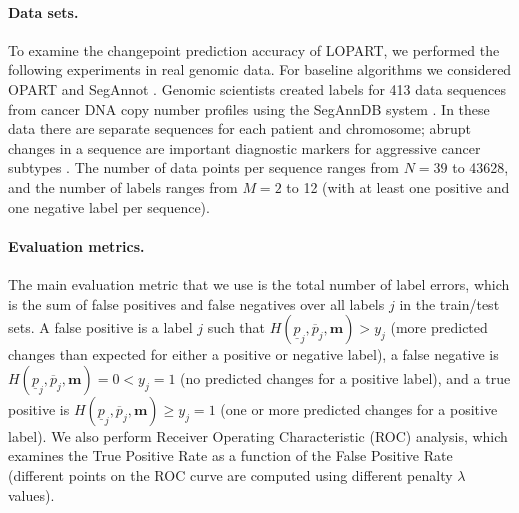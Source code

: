 \documentclass[12pt]{article}
\begin{document}
\paragraph{Data sets.} To examine the changepoint prediction accuracy of LOPART, we performed the following experiments in real genomic data. 
For baseline algorithms we considered OPART \citep{Jackson2005} and SegAnnot \citep{Hocking2014}.
Genomic scientists created labels for 413 data sequences from cancer DNA copy number profiles using the SegAnnDB system \citep{Hocking2014}.  
In these data there are separate sequences for each patient and chromosome; abrupt changes in a sequence are important diagnostic markers for aggressive cancer subtypes \citep{gudrun-jclinicaloncology}.
The number of data points per sequence ranges from $N=39$ to 43628, and the number of labels ranges from $M=2$ to 12 (with at least one positive and one negative label per sequence).

\paragraph{Evaluation metrics.} The main evaluation metric that we use is the total number of label errors, which is the sum of false positives and false negatives over all labels $j$ in the train/test sets.
A false positive is a label $j$ such that $H(\underline p_j, \overline p_j, \mathbf m) > y_j$ (more predicted changes than expected for either a positive or negative label),
a false negative is $H(\underline p_j, \overline p_j, \mathbf m) = 0 < y_j=1$ (no predicted changes for a positive label), and
a true positive is $H(\underline p_j, \overline p_j, \mathbf m) \geq y_j=1$ (one or more predicted changes for a positive label).
We also perform Receiver Operating Characteristic (ROC) analysis, which examines the True Positive Rate as a function of the False Positive Rate (different points on the ROC curve are computed using different penalty $\lambda$ values).

\end{document}
